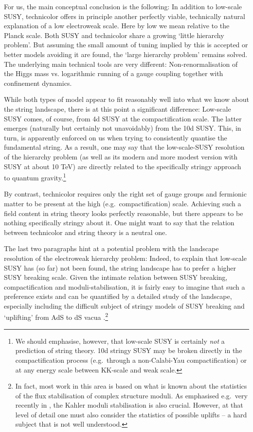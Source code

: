 \documentclass[12pt]{article}
\numberwithin{equation}{section}
\begin{document}
For us, the main conceptual conclusion is the following: In addition to low-scale SUSY, technicolor offers in principle another perfectly viable, technically natural explanation of a low electroweak scale. Here by low we mean relative to the Planck scale. Both SUSY and technicolor share a growing `little hierarchy problem'. But assuming the small amount of tuning implied by this is accepted or better models avoiding it are found, the `large hierarchy problem' remains solved. The underlying main technical tools are very different: Non-renormalisation of  the Higgs mass vs. logarithmic running of a gauge coupling together with confinement dynamics.

While both types of model appear to fit reasonably well into what we know about the string landscape, there is at this point a significant difference: Low-scale SUSY comes, of course, from 4d SUSY at the compactification scale. The latter emerges (naturally but certainly not unavoidably) from the 10d SUSY. This, in turn, is apparently enforced on us when trying to consistently quantise the fundamental string. As a result, one may say that the low-scale-SUSY resolution of the hierarchy problem (as well as its modern and more modest version with SUSY at about 10 TeV) are directly related to the specifically stringy approach to quantum gravity.\footnote{
We 
should emphasise, however, that low-scale SUSY is certainly {\it not} a prediction of string theory. 10d stringy SUSY may be broken directly in the compactification process (e.g.~through a non-Calabi-Yau compactification) or at any energy scale between KK-scale and weak scale.
}

By contrast, technicolor requires only the right set of gauge groups and fermionic matter to be present at the high (e.g.~compactification) scale. Achieving such a field content in string theory looks perfectly reasonable, but there appears to be nothing specifically stringy about it. One might want to say that the relation between technicolor and string theory is a neutral one.

The last two paragraphs hint at a potential problem with the landscape resolution of the electroweak hierarchy problem: Indeed, to explain that low-scale SUSY has (so far) not been found, the string landscape has to prefer a higher SUSY breaking scale. Given the intimate relation between SUSY breaking, compactification and moduli-stabilisation, it is fairly easy to imagine that such a preference exists and can be quantified by a detailed study of the landscape, especially including the difficult subject of  stringy models of SUSY breaking and `uplifting' from AdS to dS vacua \cite{Denef:2004cf, Susskind:2004uv, Douglas:2004qg, Giudice:2006sn, Acharya:2008zi, Baer:2019zfl}.\footnote{In fact, most work in this area is based on what is known about the statistics of the flux stabilisation of complex structure moduli. As emphasised e.g.~very recently in \cite{Broeckel:2020fdz}, the Kahler moduli stabilisation is also crucial. However, at that level of detail one must also consider the statistics of possible uplifts -- a hard subject that is not well understood.}
\end{document}
